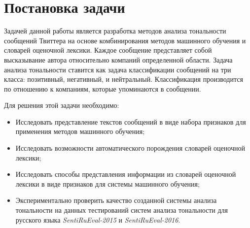 \newpage
\section{Постановка задачи}
%
%
Задачей данной работы является разработка методов анализа тональности сообщений
Твиттера на основе комбинирования методов машинного обучения и словарей
оценочной лексики.
Каждое сообщение представляет собой высказывание автора относительно компаний
определенной области.
Задача анализа тональности ставится как задача классификации сообщений на три
класса: позитивный, негативный, и нейтральный.
Классификация производится по отношению к компаниям, которые упоминаются в
сообщении.

%
%
Для решения этой задачи необходимо:
\begin{itemize}
    \item Исследовать представление текстов сообщений в виде набора признаков для
        применения методов машинного обучения;
    \item Исследовать возможности автоматического порождения словарей оценочной
        лексики;
    \item Исследовать способы представления информации из словарей оценочной
        лексики в виде признаков для системы машинного обучения;
    \item Экспериментально проверить качество созданной системы анализа
        тональности на данных тестирований систем анализа тональности для
        русского языка {\it SentiRuEval-2015} и {\it SentiRuEval-2016}.
\end{itemize}
